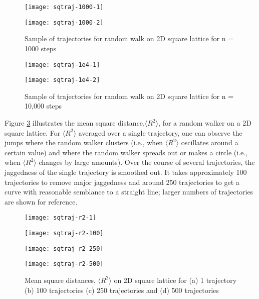 \documentclass[12pt, oneside]{article}
\begin{document}
\begin{figure}
\begin{minipage}[htbp]{.49\linewidth}
\centering
\texttt{[image: sqtraj-1000-1]}
\end{minipage}
\begin{minipage}[htbp]{.49\linewidth}
\centering
\texttt{[image: sqtraj-1000-2]}
\end{minipage}
\caption{Sample of trajectories for random walk on 2D square lattice for n = 1000 steps}
\label{fig:sqtraj1000}
\end{figure}

\begin{figure}
\begin{minipage}[htbp]{.49\linewidth}
\centering
\texttt{[image: sqtraj-1e4-1]}
\end{minipage}
\begin{minipage}[htbp]{.49\linewidth}
\centering
\texttt{[image: sqtraj-1e4-2]}
\end{minipage}
\caption{Sample of trajectories for random walk on 2D square lattice for n = 10,000 steps}
\label{fig:sqtraj1e4}
\end{figure}

Figure \ref{fig:sqr2} illustrates the mean square distance,$\langle R^2 \rangle$, for a random walker on a 2D square lattice. For $\langle R^2 \rangle$ averaged over a single trajectory, one can observe the jumps where the random walker clusters (i.e., when $\langle R^2 \rangle$ oscillates around a certain value) and where the random walker spreads out or makes a circle (i.e., when $\langle R^2 \rangle$ changes by large amounts). Over the course of several trajectories, the jaggedness of the single trajectory is smoothed out. It takes approximately 100 trajectories to remove major jaggedness and around 250 trajectories to get a curve with reasonable semblance to a straight line; larger numbers of trajectories are shown for reference.

\begin{figure}
\begin{minipage}[htbp]{.49\linewidth}
\centering
\texttt{[image: sqtraj-r2-1]}
\end{minipage}
\begin{minipage}[htbp]{.49\linewidth}
\centering
\texttt{[image: sqtraj-r2-100]}
\end{minipage}
\begin{minipage}[htbp]{.49\linewidth}
\centering
\texttt{[image: sqtraj-r2-250]}
\end{minipage}
\begin{minipage}[htbp]{.49\linewidth}
\centering
\texttt{[image: sqtraj-r2-500]}
\end{minipage}
\caption{Mean square distances, $\langle R^2 \rangle$ on 2D square lattice for (a) 1 trajectory (b) 100 trajectories (c) 250 trajectories and (d) 500 trajectories}
\label{fig:sqr2}
\end{figure}
\end{document}
